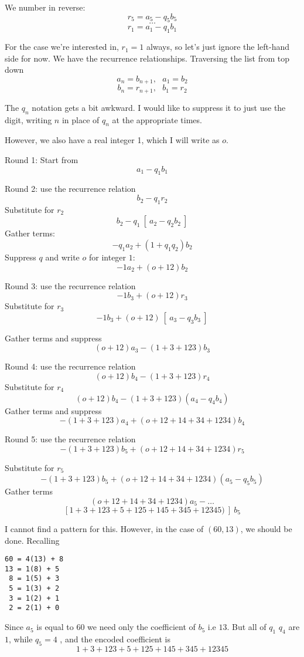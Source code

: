 \documentclass[11pt, oneside]{article}   	%
\begin{document}
We number in reverse:
\[ r_5 = a_5 - q_5b_5 \]
\[ \dots \]
\[ r_1 = a_1 - q_1b_1  \]

For the case we're interested in, $r_1 = 1$ always, so let's just ignore the left-hand side for now.  We have the recurrence relationships.  Traversing the list from top down
\[ a_n = b_{n+1} , \ \ \ a_1 = b_2 \]
\[ b_n = r_{n+1}, \ \ \ b_1 = r_2  \]

The $q_n$ notation gets a bit awkward. I would like to suppress it to just use the digit, writing $n$ in place of $q_n$ at the appropriate times.

However, we also have a real integer 1, which I will write as $o$.

Round 1:  Start from 
\[ a_1 - q_1 b_1  \]

Round 2:  use the recurrence relation
\[ b_2 - q_1 r_2  \]
Substitute for $r_2$ 
\[ b_2 - q_1 \ [ \ a_2 - q_2 b_2 \ ] \]
Gather terms:
\[ - q_1a_2 + (1 +  q_1 q_2) b_2 \]
Suppress $q$ and write $o$ for integer $1$:
\[ - 1a_2 + (o +  12) b_2 \]

Round 3:  use the recurrence relation
\[ - 1b_3 + (o +  12) r_3 \]
Substitute for $r_3$
\[ - 1b_3 + (o +  12) \ [ \ a_3 - q_3 b_3 \ ] \]

Gather terms and suppress
\[  (o +  12)a_3 - (1 + 3 + 123) b_3 \]

Round 4:  use the recurrence relation
\[  (o +  12)b_4 - (1 + 3 + 123) r_4 \]
Substitute for $r_4$
\[  (o +  12)b_4 - (1 + 3 + 123) (a_4 - q_4 b_4) \]
Gather terms and suppress
\[  -(1 + 3 + 123)a_4 + (o + 12 + 14 + 34 + 1234)b_4  \]

Round 5:  use the recurrence relation
\[  -(1 + 3 + 123)b_5 + (o + 12 + 14 + 34 + 1234)r_5  \]

Substitute for $r_5$
\[  -(1 + 3 + 123)b_5 + (o + 12 + 14 + 34 + 1234) (a_5 - q_5 b_5)  \]
Gather terms 
\[ (o + 12 + 14 + 34 + 1234)a_5 - \dots  \]
\[  [  1  + 3 + 123 + 5 + 125 + 145 + 345  + 12345)  \ ] \ b_5 \]

I cannot find a pattern for this.  However, in the case of $(60,13)$, we should be done.  Recalling

\begin{verbatim}
60 = 4(13) + 8
13 = 1(8) + 5
 8 = 1(5) + 3
 5 = 1(3) + 2
 3 = 1(2) + 1
 2 = 2(1) + 0
\end{verbatim}

Since $a_5$ is equal to $60$ we need only the coefficient of $b_5$ i.e $13$.  But all of $q_1$ $q_4$ are $1$, while $q_5 = 4$ , and the encoded coefficient is
\[  1  + 3 + 123 + 5 + 125 + 145 + 345  + 12345  \]
\end{document}

